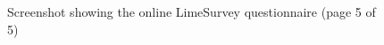 \begin{figure}
\ContinuedFloat
 \centering
 \caption[Screenshot showing the online questionnaire (page 5 of 5)]{Screenshot showing the online LimeSurvey questionnaire (page 5 of 5)}
 \label{appendix:appendicies:developer-suvery-one-page-005}
\end{figure}



